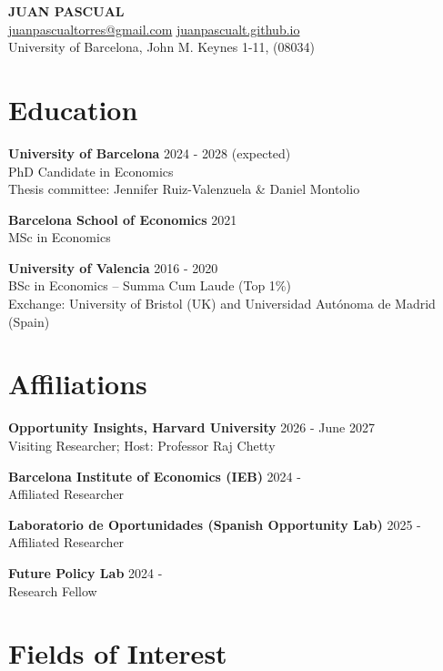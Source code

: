 \documentclass[11pt,a4paper]{article}
\begin{document}
\begin{center}
    {\LARGE \textbf{JUAN PASCUAL}}\\[0.4em]
    \href{mailto:juanpascualtorres@gmail.com}{juanpascualtorres@gmail.com} \hspace{1em} \href{https://juanpascualt.github.io/}{juanpascualt.github.io}\\[0.3em]
    University of Barcelona, John M. Keynes 1-11, (08034)
\end{center}

\section*{Education}

\textbf{University of Barcelona} \hfill 2024 - 2028 (expected)\\
PhD Candidate in Economics\\
Thesis committee: Jennifer Ruiz-Valenzuela \& Daniel Montolio

\textbf{Barcelona School of Economics} \hfill 2021\\
MSc in Economics

\textbf{University of Valencia} \hfill 2016 - 2020\\
BSc in Economics -- Summa Cum Laude (Top 1\%)\\
Exchange: University of Bristol (UK) and Universidad Autónoma de Madrid (Spain)

\section*{Affiliations}
\textbf{Opportunity Insights, Harvard University} \hfill 2026 - June 2027\\
Visiting Researcher; Host: Professor Raj Chetty

\textbf{Barcelona Institute of Economics (IEB)} \hfill 2024 -\\
Affiliated Researcher

\textbf{Laboratorio de Oportunidades (Spanish Opportunity Lab)} \hfill 2025 -\\
Affiliated Researcher

\textbf{Future Policy Lab} \hfill 2024 -\\
Research Fellow

\section*{Fields of Interest}
\end{document}
